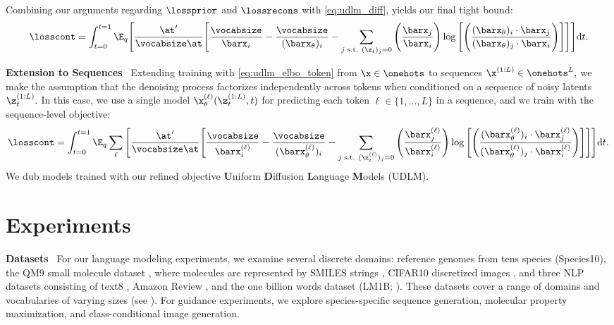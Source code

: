 \documentclass{article} %
\begin{document}
Combining our arguments regarding $\lossprior$ and $\lossrecons$ with \eqref{eq:udlm_diff}, yields our final tight bound:
\begin{equation}\label{eq:udlm_elbo_token}
    \losscont = \int_{t=0}^{t=1}\E_q\Bigg[
    \frac{\at'}{\vocabsize\at}\Bigg[\frac{\vocabsize}{\barx_i} - \frac{\vocabsize}{(\barx_\theta)_i} -\sum_{\substack{j \text{ s.t. }(\z_t)_j = 0}} \Bigg(\frac{\barx_j}{\barx_i}\Bigg) \log\Bigg[\Bigg(\frac{(\barx_\theta)_i\cdot\barx_j}{(\barx_\theta)_j\cdot\barx_i}\Bigg)\Bigg]
    \Bigg]\Bigg]\mathrm{d}t.
\end{equation}

\textbf{Extension to Sequences}~
Extending training with \eqref{eq:udlm_elbo_token} from $\x \in \onehots$ to sequences $\x^{(1:L)}\in\onehots^L,$ we make the assumption that the denoising process factorizes independently across tokens when conditioned on a sequence of noisy latents $\z_t^{(1:L)}.$
In this case, we use a single model $\x^{(\ell)}_\theta(\z_t^{(1:L)}, t)$ for predicting each token $\ell \in \{1, \ldots, L\}$ in a sequence, and we train with the sequence-level objective:
\begin{equation}
    \losscont
    = \int_{t=0}^{t=1}\E_q \sum_\ell\Bigg[
    \frac{\at'}{\vocabsize\at}\Bigg[\frac{\vocabsize}{\barx_i^{(\ell)}} - \frac{\vocabsize}{(\barx_\theta^{(\ell)})_i} -\sum_{\substack{j \text{ s.t. }(\z_t^{(\ell)})_j = 0}} \Bigg(\frac{\barx_j^{(\ell)}}{\barx_i^{(\ell)}}\Bigg) \log\Bigg[\Bigg(\frac{(\barx_\theta^{(\ell)})_i\cdot\barx_j^{(\ell)}}{(\barx_\theta^{(\ell)})_j\cdot\barx_i^{(\ell)}}\Bigg)\Bigg]
    \Bigg]\Bigg]\mathrm{d}t.
\end{equation}
We dub models trained with our refined objective \textbf{U}niform \textbf{D}iffusion \textbf{L}anguage \textbf{M}odels (UDLM).

\section{Experiments}\label{sec:exp}
\textbf{Datasets}~
For our language modeling experiments, we examine several discrete domains:
reference genomes from tens species (Species10),
the QM9 small molecule dataset \citep{ruddigkeit2012enumeration, ramakrishnan2014quantum}, where molecules are represented by SMILES strings \citep{weininger1988smiles},  CIFAR10 discretized images \citep{krizhevsky2009learning},
and three NLP datasets consisting of text8 \citep{text8}, Amazon Review \citep{mcauley2013hidden, zhang2015character}, and the one billion words dataset (LM1B; \citet{chelba2014billion}).
These datasets cover a range of domains and vocabularies of varying sizes (see ).
For guidance experiments, we explore species-specific sequence generation, molecular property maximization, and class-conditional image generation.
\end{document}
